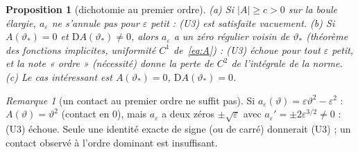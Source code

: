 \documentclass[11pt,a4paper]{article}
\newtheorem{proposition}[theoreme]{Proposition}
\theoremstyle{remark}
\newtheorem{remarque}[theoreme]{Remarque}
\newcommand{\vth}{\vartheta}
\newcommand{\D}{\mathrm D}
\begin{document}
\begin{proposition}[dichotomie au premier ordre]\label{prop:dich}
(a) Si $\lvert A\rvert\ge c>0$ sur la boule élargie, $a_\varepsilon$ ne s'annule pas pour $\varepsilon$ petit : (U3) est satisfaite \emph{vacuement}. (b) Si $A(\vth_*)=0$ et $\D A(\vth_*)\ne0$, alors $a_\varepsilon$ a un zéro régulier voisin de $\vth_*$ (théorème des fonctions implicites, uniformité $C^1$ de~\eqref{eq:A}) : (U3) échoue pour tout $\varepsilon$ petit, et la note « ordre » (nécessité) donne la perte de $C^2$ de l'intégrale de la norme. (c) Le cas intéressant est $A(\vth_*)=0$, $\D A(\vth_*)=0$.
\end{proposition}

\begin{remarque}[un contact au premier ordre ne suffit pas]\label{rem:contact1}
Si $a_\varepsilon(\vth)=\varepsilon\vth^2-\varepsilon^2$ : $A(\vth)=\vth^2$ (contact en $0$), mais $a_\varepsilon$ a deux zéros $\pm\sqrt\varepsilon$ avec $a_\varepsilon'=\pm2\varepsilon^{3/2}\ne0$ : (U3) échoue. Seule une identité exacte de signe (ou de carré) donnerait (U3) ; un contact observé à l'ordre dominant est insuffisant.
\end{remarque}
\end{document}
